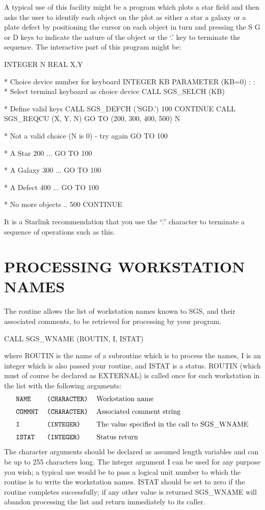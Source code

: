 \documentclass[11pt]{starlink}
\begin{document}
A typical use of this facility might be a program which plots a star field and
then asks the user to identify each object on the plot as either a star a
galaxy or a plate defect by positioning the cursor on each object in turn and
pressing the S G or D keys to indicate the nature of the object or the `.' key
to terminate the sequence.  The interactive part of this program might be:
\begin{terminalv}
     INTEGER N
     REAL X,Y

*   Choice device number for keyboard
     INTEGER KB
     PARAMETER (KB=0)
       :
       :
*   Select terminal keyboard as choice device
     CALL SGS_SELCH (KB)

*   Define valid keys
     CALL SGS_DEFCH ('SGD.')
100   CONTINUE
     CALL SGS_REQCU (X, Y, N)
     GO TO (200, 300, 400, 500) N

*   Not a valid choice (N is 0) - try again
     GO TO 100

*   A Star
200   ...
     GO TO 100

*   A Galaxy
300   ...
     GO TO 100

*   A Defect
400   ...
     GO TO 100

*   No more objects ..
 500 CONTINUE
\end{terminalv}
It is a Starlink recommendation that you use the ``.'' character to terminate a
sequence of operations such as this.

\section {PROCESSING WORKSTATION NAMES}\label{sec-processing}

The routine
allows the list of workstation names known to SGS,
and their associated comments, to be retrieved for processing by your
program.
\begin{terminalv}
CALL SGS_WNAME (ROUTIN, I, ISTAT)
\end{terminalv}
where ROUTIN is the name of a subroutine which is to process the names, I
is an integer which is also passed your routine,
and ISTAT is a status.  ROUTIN (which must of course be
declared as EXTERNAL) is called once for
each workstation in the list with the following arguments:
\[\begin{tabular}{lll}
\tt NAME&\tt (CHARACTER)&Workstation name\\[\medskipamount]
\tt COMMNT&\tt (CHARACTER)&Associated comment string\\[\medskipamount]
\tt I&\tt (INTEGER)&The value specified in the call to
SGS\_WNAME\\[\medskipamount]
\tt ISTAT&\tt (INTEGER)&Status return
\end{tabular}\]
The character arguments should be declared as assumed length variables and
can be up to 255 characters long.  The integer argument I can be used for
any purpose you wish; a typical use would be to pass a logical unit number
to which the routine is to write the workstation names.  ISTAT should be
set to zero if the routine completes successfully; if any other value is
returned SGS\_WNAME will abandon processing the list and return immediately
to its caller.
\end{document}
